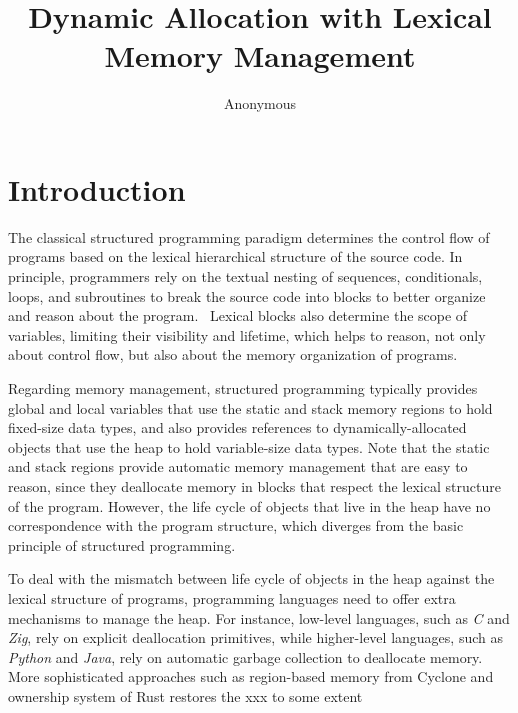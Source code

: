 \documentclass[12pt]{article}
\title {
    Dynamic Allocation with Lexical Memory Management
}
\author{Anonymous}
\begin{document}
\maketitle

\begin{abstract}
\end{abstract}


\section{Introduction}

The classical structured programming paradigm determines the control flow of
programs based on the lexical hierarchical structure of the source code.
%
In principle, programmers rely on the textual nesting of sequences,
conditionals, loops, and subroutines to break the source code into blocks to
better organize and reason about the program.~\cite{TODO}
%
Lexical blocks also determine the scope of variables, limiting their visibility
and lifetime, which helps to reason, not only about control flow, but also
about the memory organization of programs.

Regarding memory management, structured programming typically provides global
and local variables that use the static and stack memory regions to hold
fixed-size data types, and also provides references to dynamically-allocated
objects that use the heap to hold variable-size data types.
%
Note that the static and stack regions provide automatic memory management that
are easy to reason, since they deallocate memory in blocks that respect the
lexical structure of the program.
%
However, the life cycle of objects that live in the heap have no correspondence
with the program structure, which diverges from the basic principle of
structured programming.

To deal with the mismatch between life cycle of objects in the heap against the
lexical structure of programs, programming languages need to offer extra
mechanisms to manage the heap.
%
For instance, low-level languages, such as \emph{C} and \emph{Zig}, rely on
explicit deallocation primitives, while higher-level languages, such as
\emph{Python} and \emph{Java}, rely on automatic garbage collection to
deallocate memory.
%
More sophisticated approaches such as region-based memory from Cyclone and
ownership system of Rust restores the xxx to some extent
\end{document}
